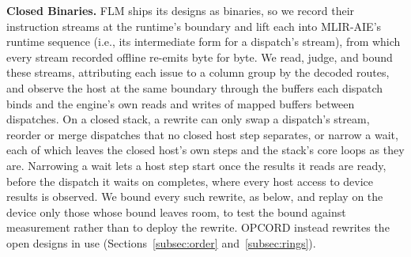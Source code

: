 \textbf{Closed Binaries.}
\label{subsec:closed}
FLM ships its designs as binaries, so we record their instruction streams at the runtime's boundary and lift each into MLIR-AIE's runtime sequence (i.e., its intermediate form for a dispatch's stream), from which every stream recorded offline re-emits byte for byte.
We read, judge, and bound these streams, attributing each issue to a column group by the decoded routes, and observe the host at the same boundary through the buffers each dispatch binds and the engine's own reads and writes of mapped buffers between dispatches.
On a closed stack, a rewrite can only swap a dispatch's stream, reorder or merge dispatches that no closed host step separates, or narrow a wait, each of which leaves the closed host's own steps and the stack's core loops as they are.
Narrowing a wait lets a host step start once the results it reads are ready, before the dispatch it waits on completes, where every host access to device results is observed.
We bound every such rewrite, as below, and replay on the device only those whose bound leaves room, to test the bound against measurement rather than to deploy the rewrite.
OPCORD instead rewrites the open designs in use (Sections~\ref{subsec:order} and~\ref{subsec:rings}).

